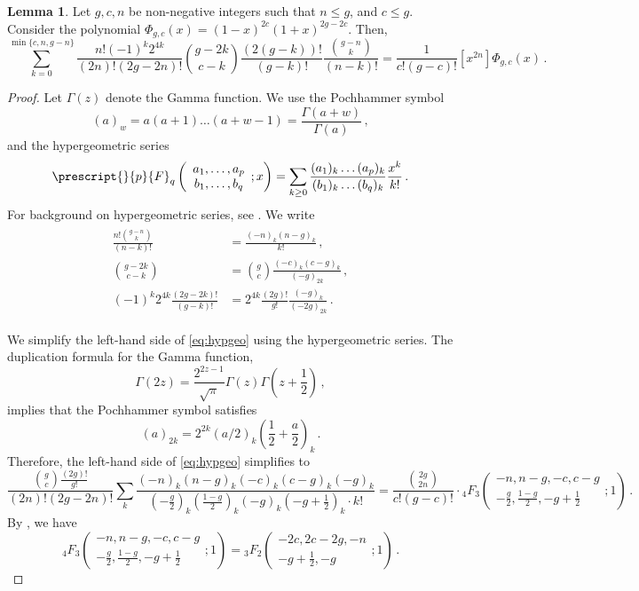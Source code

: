 \documentclass[11pt]{article}
\theoremstyle{definition}
\newtheorem{lemma}[definition]{Lemma}
\begin{document}
\begin{lemma}\label{lem:Hypergeometric}
    Let $g,c,n$ be non-negative integers such that $n \leq g$, and $c \leq g$. Consider the polynomial $\Phi_{g,c}(x) = (1-x)^{2c}(1+x)^{2g-2c}$. Then,
    \begin{equation}\label{eq:hypgeo}
        \sum_{k=0}^{\min\{c,n,g-n\}}\frac{n!(-1)^k2^{4k}}{(2n)!(2g-2n)!}\binom{g-2k}{c-k}\frac{(2(g-k))!}{(g-k)!}\frac{\binom{g-n}{k}}{(n-k)!} = \frac{1}{c!(g-c)!}[x^{2n}]\Phi_{g,c}(x)\, .
    \end{equation}
\end{lemma}
\begin{proof}
Let $\Gamma(z)$ denote the Gamma function. We use the Pochhammer symbol
$$
(a)_w = a(a+1)\ldots (a+w-1) = \frac{\Gamma(a+w)}{\Gamma(a)}\,,
$$
and the hypergeometric series
    $$
    \prescript{}{p}{F}_q\left(\begin{array}{c}
        a_1, \ldots , a_p \\
        b_1, \ldots , b_q
    \end{array};x\right) = \sum_{k \geq 0}\frac{(a_1)_k\ldots (a_p)_k}{(b_1)_k\ldots (b_q)_k}\frac{x^k}{k!}\, .
    $$
    For background on hypergeometric series, see \cite{hyperbook}. We write
    \begin{align}
    \begin{split}\label{eq:binom}
    \frac{n!\binom{g-n}{k}}{(n-k)!} &= \frac{(-n)_k(n-g)_k}{k!}\, ,\\
    \binom{g-2k}{c-k} &= \binom{g}{c}\frac{(-c)_k(c-g)_k}{(-g)_{2k}}\,, \\
    (-1)^k2^{4k}\frac{(2g-2k)!}{(g-k)!} & =2^{4k}\frac{(2g)!}{g!}\frac{(-g)_k}{(-2g)_{2k}}\,.
    \end{split}
    \end{align}

    We simplify the left-hand side of \eqref{eq:hypgeo} using the hypergeometric series. The duplication formula for the Gamma function,
    \[
    \Gamma(2z) =
    \frac{2^{2z-1}}{\sqrt{\pi}}\Gamma(z) \Gamma(z + \frac{1}{2})\,,
    \]
    implies that the Pochhammer symbol satisfies
    \[
    (a)_{2k} = 2^{2k}(a/2)_k(\frac{1}{2}+\frac{a}{2})_k\,.
    \]
    Therefore, the left-hand side of \eqref{eq:hypgeo} simplifies to
    $$
    \frac{\binom{g}{c}\frac{(2g)!}{g!}}{(2n)!(2g-2n)!}\sum_{k}\frac{(-n)_k(n-g)_k(-c)_k(c-g)_k(-g)_k}{(-\frac{g}{2})_k(\frac{1-g}{2})_k(-g)_k(-g+\frac{1}{2})_k\cdot k!} = \frac{\binom{2g}{2n}}{c!(g-c)!}\cdot{}_{4}{F}_3\left(\begin{array}{c}
        -n, n-g, -c, c-g \\
        -\frac{g}{2}, \frac{1-g}{2}, -g+\frac{1}{2}
    \end{array};1\right)\, .
    $$
    By \cite[(2.31)]{Hypergeometric}, we have
    $$
    {}_{4}{F}_3\left(\begin{array}{c}
        -n, n-g, -c, c-g \\
        -\frac{g}{2}, \frac{1-g}{2}, -g+\frac{1}{2}
    \end{array};1\right) = {}_{3}{F}_2\left(\begin{array}{c}
        -2c, 2c-2g, -n \\
        -g+\frac{1}{2}, -g
    \end{array};1\right)\, .
    $$


\end{proof}
\end{document}
